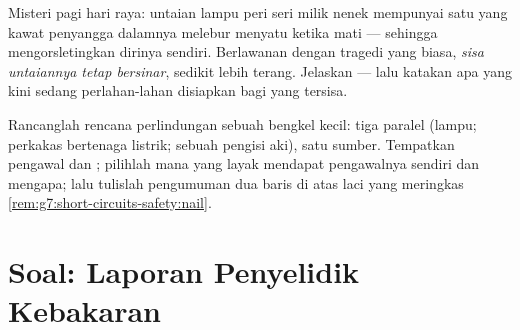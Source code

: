 \begin{exercise}[$\star\star$]\label{exo:g7:short-circuits-safety:11}
Misteri pagi hari raya: untaian lampu peri seri milik nenek mempunyai
satu  yang kawat penyangga dalamnya melebur menyatu ketika mati
--- sehingga mengorsletingkan dirinya sendiri. Berlawanan dengan
tragedi yang biasa, \emph{sisa untaiannya tetap bersinar}, sedikit
lebih terang. Jelaskan --- lalu katakan apa yang kini sedang
perlahan-lahan disiapkan bagi  yang tersisa.
\end{exercise}

\begin{exercise}[$\star\star\star$]\label{exo:g7:short-circuits-safety:12}
Rancanglah rencana perlindungan sebuah bengkel kecil: tiga 
paralel (lampu; perkakas bertenaga listrik; sebuah pengisi aki), satu
sumber. Tempatkan pengawal dan ; pilihlah  mana yang
layak mendapat pengawalnya sendiri dan mengapa; lalu tulislah
pengumuman dua baris di atas laci  yang meringkas
\cref{rem:g7:short-circuits-safety:nail}.
\end{exercise}

\section{Soal: Laporan Penyelidik Kebakaran}

